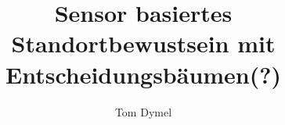 \documentclass[de,inputenc=utf8]{tuhhthesis}
\author{Tom Dymel}
\title{Sensor basiertes Standortbewustsein mit Entscheidungsbäumen(?)}
\institute{InstTelematics}
\begin{document}







\begin{tuhhappendix}
  
\end{tuhhappendix}


\end{document}
